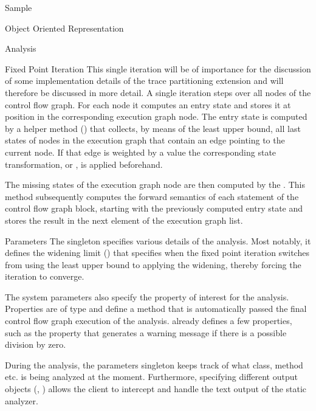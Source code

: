 \begin{chapter}{Sample}
\begin{section}{Object Oriented Representation}
\begin{subsection}{Analysis}
\begin{subsubsection}{Fixed Point Iteration}
				This single iteration will be of importance for the discussion of some implementation details of the trace partitioning extension and will therefore be discussed in more detail. A single iteration steps over all nodes of the control flow graph. For each node it computes an entry state and stores it at position  in the corresponding execution graph node. The entry state is computed by a helper method () that collects, by means of the least upper bound, all last states of nodes in the execution graph that contain an edge pointing to the current node. If that edge is weighted by a  value the corresponding state transformation,  or , is applied beforehand.

				The missing states of the execution graph node are then computed by the . This method subsequently computes the forward semantics of each statement of the control flow graph block, starting with the previously computed entry state and stores the result in the next element of the execution graph list.
			\end{subsubsection}


			\begin{subsubsection}{Parameters}
				The singleton  specifies various details of the analysis. Most notably, it defines the widening limit () that specifies when the fixed point iteration switches from using the least upper bound to applying the widening, thereby forcing the iteration to converge. 
				
				The system parameters also specify the property of interest for the analysis. Properties are of type  and define a method that is automatically passed the final control flow graph execution of the analysis. \sample already defines a few properties, such as the  property that generates a warning message if there is a possible division by zero.

				During the analysis, the parameters singleton keeps track of what class, method etc. is being analyzed at the moment. Furthermore, specifying different output objects (, ) allows the client to intercept and handle the text output of the static analyzer.
			\end{subsubsection}
		\end{subsection}
	\end{section}


\end{chapter}
